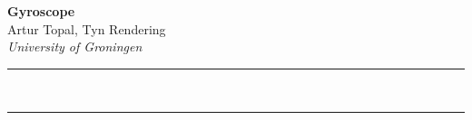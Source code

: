 \documentclass[a4paper,9pt]{article}
\renewenvironment{abstract}
 {\par\noindent\textbf{\abstractname}\ \ignorespaces \\}
 {\par\noindent\medskip}
\begin{document}
\pagestyle{fancy}
\thispagestyle{empty}
\fancyhead[L]{}

\renewcommand*{\thefootnote}{\fnsymbol{footnote}}

\begin{center}
\Large{\textbf{Gyroscope}}
\vspace{0.4cm}
\normalsize
\\ Artur Topal, Tyn Rendering \\
\vspace{0.1cm}
\textit{University of Groningen}
\medskip
\normalsize
\end{center}

\vspace{3cm}
{\color{gray}\hrule}
\vspace{0.4cm}

\begin{abstract}

\end{abstract}

{\color{gray}\hrule}
\medskip

\pagebreak
\tableofcontents
\pagebreak







\appendix



\printbibliography
\end{document}
